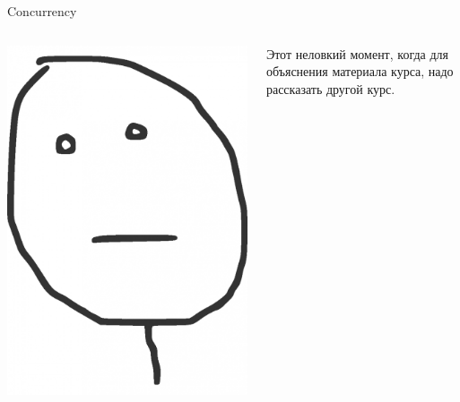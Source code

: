 \begin{frame}[fragile]{Concurrency}
    \begin{columns}[t] %
         \begin{column}[T]{5cm} %
            \begin{center}
              \includegraphics[width=\textwidth,keepaspectratio]{sources/images/etot-nelovkiy-moment_9027667_big_.png}
            \end{center}
         \end{column}
         \begin{column}[T]{5cm} %
            \begin{center}
            Этот неловкий момент, когда для объяснения материала курса, надо рассказать другой курс.
            \end{center}
         \end{column}
     \end{columns}
\end{frame}
